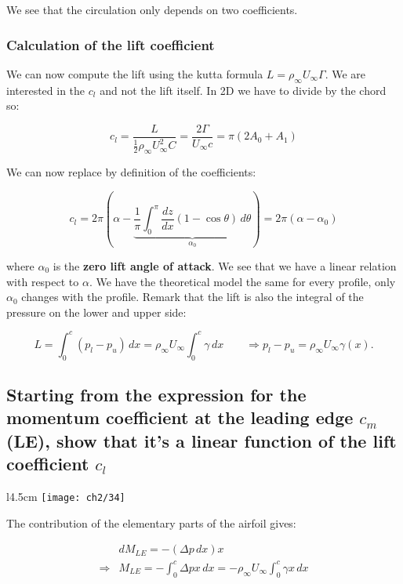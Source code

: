 \documentclass[british,french,11pt, a4paper, openany]{article}
\begin{document}
We see that the circulation only depends on two coefficients. 

\subsubsection{Calculation of the lift coefficient}
We can now compute the lift using the kutta formula $L = \rho _\infty U_\infty \Gamma$. We are interested in the $c_l$ and not the lift itself. In 2D we have to divide by the chord so: 

\begin{equation}
c_l = \frac{L}{\frac{1}{2} \rho _\infty U_\infty ^2 C} = \frac{2\Gamma}{U_\infty c} = \pi (2A_0 + A_1)
\label{eq:2.70}
\end{equation}

We can now replace by definition of the coefficients: 

\begin{equation}
c_l = 2\pi\left(\alpha - \underbrace{\frac{1}{\pi} \int _0^\pi \frac{dz}{dx} (1-\cos \theta)\, d\theta}_{\alpha _0} \right) = 2\pi (\alpha - \alpha _0)
\label{eq:2.71}
\end{equation}

where $\alpha _0$ is the \textbf{zero lift angle of attack}. We see that we have a linear relation with respect to $\alpha$. We have the theoretical model the same for every profile, only $\alpha _0$ changes with the profile. Remark that the lift is also the integral of the pressure on the lower and upper side:

\begin{equation}
L = \int _0 ^c (p_l - p_u) \, dx = \rho _\infty U_\infty \int _0 ^c \gamma \, dx \qquad \Rightarrow p_l - p_u = \rho _\infty U_\infty \gamma (x).
\end{equation}

\subsection{Starting from the expression for the momentum coefficient at the leading edge $c_m$(LE), show that it’s a linear function of the lift coefficient $c_l$}


\begin{wrapfigure}[5]{l}{4.5cm}
	\vspace{-5mm}
	\texttt{[image: ch2/34]}
\end{wrapfigure}
The contribution of the elementary parts of the airfoil gives:

\begin{equation}
\begin{aligned}
&dM_{LE} = - (\Delta p \, dx) x \\ 
\Rightarrow &M_{LE} = -\int _0 ^c \Delta p x \, dx = - \rho _\infty U_\infty \int _0^c \gamma x \, dx
\end{aligned}
\end{equation}
\end{document}
